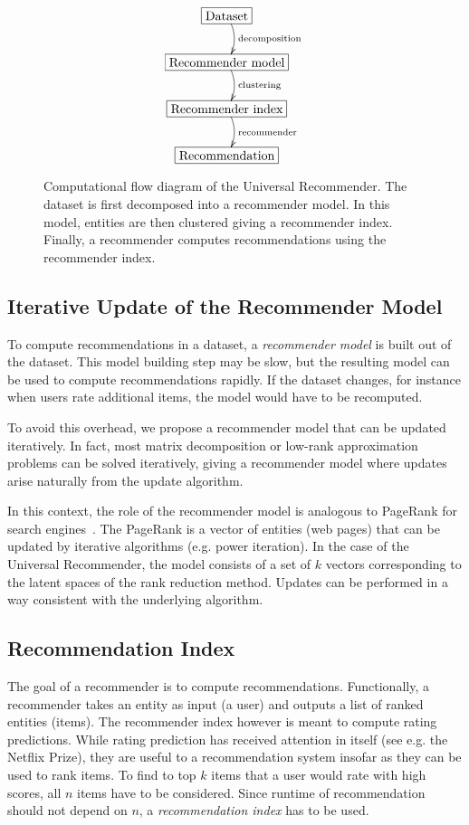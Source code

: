 \documentclass{article}
\begin{document}
\begin{figure}
  \begin{displaymath}
    \xymatrix{
      *+[F]{\text{Dataset}} \ar@/^/[d]^{\text{decomposition}} \\
      *+[F]{\text{Recommender model}} \ar@/^/[d]^{\text{clustering}} \\
      *+[F]{\text{Recommender index}} \ar@/^/[d]^{\text{recommender}} \\
      *+[F]{\text{Recommendation}}
    }
  \end{displaymath}
  \caption{
    Computational flow diagram of the Universal Recommender.  
    The dataset is first decomposed into a recommender model.  
    In this model, entities are then clustered giving a recommender
    index.
    Finally, a recommender computes recommendations using the
    recommender index. 
  }
  \label{fig:flow}
\end{figure}

\subsection{Iterative Update of the Recommender Model}
To compute recommendations in a dataset, a \emph{recommender model} is
built out of the dataset.  This model building step may be slow, but the
resulting model can be used to compute recommendations rapidly.  If the
dataset changes, for instance when users rate additional items, the
model would have to be recomputed.  

To avoid this overhead, we propose a recommender model that can be
updated iteratively.  In fact, most matrix decomposition or low-rank
approximation problems can be solved iteratively, giving a recommender
model where updates arise naturally from the update algorithm. 

In this context, the role of the recommender model is analogous to
PageRank for search engines~\cite{b133}.  The PageRank is a vector of entities (web
pages) that can be updated by iterative algorithms (e.g. power
iteration).  In the case of the Universal Recommender, the model
consists of a set of $k$ vectors corresponding to the latent spaces of
the rank reduction method.  Updates can be performed in a way consistent
with the underlying algorithm. 

\subsection{Recommendation Index}
The goal of a recommender is to compute recommendations.  Functionally,
a recommender takes an entity as input (a user) and outputs a list of
ranked entities (items).  The recommender index however is meant to
compute rating predictions.  While rating prediction has received
attention in itself (see e.g. the Netflix Prize), they are useful to
a recommendation system insofar as they can be used to rank items.  To find
to top $k$ items that a user would rate with high scores, all $n$ items
have to be considered.  Since runtime of recommendation should not
depend on $n$, a \emph{recommendation index} has to be used.
\end{document}

